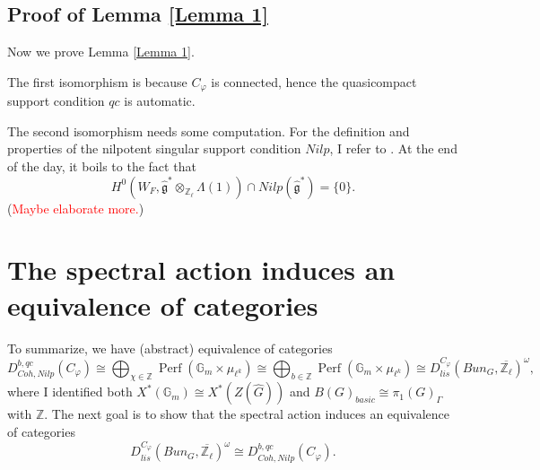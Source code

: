 \documentclass{article}
\newcommand{\red}[1]{\textcolor{red}{#1}}
\newcommand{\Rep}{\operatorname{Rep}}
\newcommand{\Perf}{\operatorname{Perf}}
\begin{document}
\subsection{Proof of Lemma \ref{Lemma 1}}
Now we prove Lemma \ref{Lemma 1}. 

The first isomorphism is because $C_{\varphi}$ is connected, hence the quasicompact support condition $qc$ is automatic. 

The second isomorphism needs some computation. For the definition and properties of the nilpotent singular support condition $Nilp$, I refer to \cite[Section VIII.2]{fargues2021geometrization}. At the end of the day, it boils to the fact that
$$H^0(W_F, \hat{\mathfrak{g}}^*\otimes_{\mathbb{Z}_{\ell}}\Lambda(1)) \cap Nilp(\hat{\mathfrak{g}}^*)=\{0\}.$$ (\red{Maybe elaborate more.})


\section{The spectral action induces an equivalence of categories}
To summarize, we have (abstract) equivalence of categories
$$D^{b, qc}_{Coh, Nilp}(C_{\varphi}) \cong \bigoplus_{\chi \in \mathbb{Z}}\Perf(\mathbb{G}_m \times \mu_{\ell^k}) \cong \bigoplus_{b \in \mathbb{Z}}\Perf(\mathbb{G}_m \times \mu_{\ell^k}) \cong D^{C_{\varphi}}_{lis}(Bun_G, \overline{\mathbb{Z}_{\ell}})^{\omega},$$
where I identified both $X^*(\mathbb{G}_m) \cong X^*(Z(\hat{G}))$ and $B(G)_{basic} \cong \pi_1(G)_{\Gamma}$ with $\mathbb{Z}$. The next goal is to show that the spectral action induces an equivalence of categories
\begin{equation}\label{Equiv}
	D_{lis}^{C_{\varphi}}(Bun_G, \overline{\mathbb{Z}_{\ell}})^{\omega} \cong D^{b, qc}_{Coh, Nilp}(C_{\varphi}).
\end{equation}

%
\end{document}
